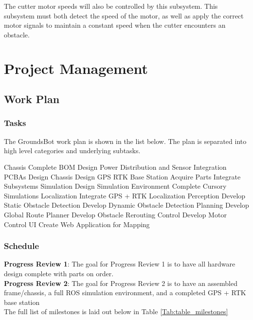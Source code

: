 \documentclass[12pt]{extarticle}
\begin{document}
			The cutter motor speeds will also be controlled by this subsystem. This subsystem must both detect the speed of the motor, as well as apply the correct motor signals to maintain a constant speed when the cutter encounters an obstacle. 


\newpage
\section{Project Management}
\subsection{Work Plan}
\subsubsection{Tasks}
The GroundsBot work plan is shown in the list below.  The plan is separated into high level categories and underlying subtasks. \\
\begin{outline}[enumerate]
  \1 Chassis
    \2 Complete BOM
    \2 Design Power Distribution and Sensor Integration PCBAs
    \2 Design Chassis
    \2 Design GPS RTK Base Station
    \2 Acquire Parts
    \2 Integrate Subsystems
  \1 Simulation
    \2 Design Simulation Environment
    \2 Complete Cursory Simulations
  \1 Localization
    \2 Integrate GPS + RTK Localization
  \1 Perception
    \2 Develop Static Obstacle Detection
    \2 Develop Dynamic Obstacle Detection
  \1 Planning
    \2 Develop Global Route Planner
    \2 Develop Obstacle Rerouting
  \1 Control
    \2 Develop Motor Control
  \1 UI
    \2 Create Web Application for Mapping
\end{outline}

   
\subsubsection{Schedule}
\textbf{Progress Review 1}: The goal for Progress Review 1 is to have all hardware design complete with parts on order. \\
\textbf{Progress Review 2}: The goal for Progress Review 2 is to have an assembled frame/chassis, a full ROS simulation environment, and a completed GPS + RTK base station\\

The full list of milestones is laid out below in Table \ref{Tab:table_milestones}\\ 
\end{document}
